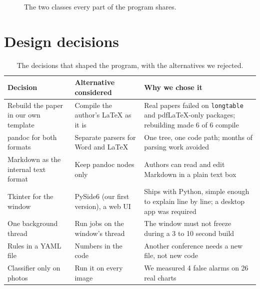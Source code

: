 \documentclass[11pt,a4paper,oneside,openany]{book}
\newcommand{\code}[1]{\texttt{#1}}
\begin{document}
\begin{figure}[htbp]
\centering
{}
\caption{The two classes every part of the program shares.}
\end{figure}

\section{Design decisions}

\begin{table}[htbp]
\centering\small
\caption{The decisions that shaped the program, with the alternatives we rejected.}
\begin{tabularx}{\linewidth}{>{\raggedright\arraybackslash}p{30mm} >{\raggedright\arraybackslash}X >{\raggedright\arraybackslash}X}
\toprule
Decision & Alternative considered & Why we chose it\\
\midrule
Rebuild the paper in our own template & Compile the author's \LaTeX{} as it is & Real papers failed on \code{longtable} and pdf\LaTeX-only packages; rebuilding made 6 of 6 compile\\
pandoc for both formats & Separate parsers for Word and \LaTeX & One tree, one code path; months of parsing work avoided\\
Markdown as the internal text format & Keep pandoc nodes only & Authors can read and edit Markdown in a plain text box\\
Tkinter for the window & PySide6 (our first version), a web UI & Ships with Python, simple enough to explain line by line; a desktop app was required\\
One background thread & Run jobs on the window's thread & The window must not freeze during a 3 to 10 second build\\
Rules in a YAML file & Numbers in the code & Another conference needs a new file, not new code\\
Classifier only on photos & Run it on every image & We measured 4 false alarms on 26 real charts\\
\bottomrule
\end{tabularx}
\end{table}
\end{document}
